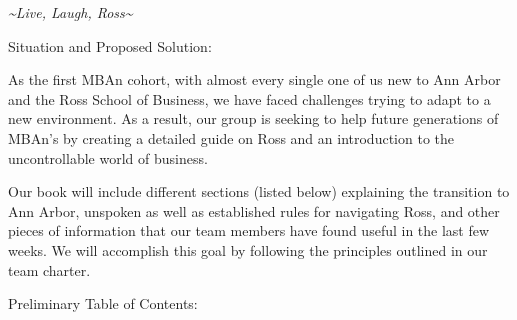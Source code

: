 \documentclass[
]{book}
\begin{document}
\emph{\textasciitilde Live, Laugh, Ross\textasciitilde{}}

Situation and Proposed Solution:

As the first MBAn cohort, with almost every single one of us new to Ann Arbor and the Ross School of Business, we have faced challenges trying to adapt to a new environment. As a result, our group is seeking to help future generations of MBAn's by creating a detailed guide on Ross and an introduction to the uncontrollable world of business.

Our book will include different sections (listed below) explaining the transition to Ann Arbor, unspoken as well as established rules for navigating Ross, and other pieces of information that our team members have found useful in the last few weeks. We will accomplish this goal by following the principles outlined in our team charter.

Preliminary Table of Contents:
\end{document}
